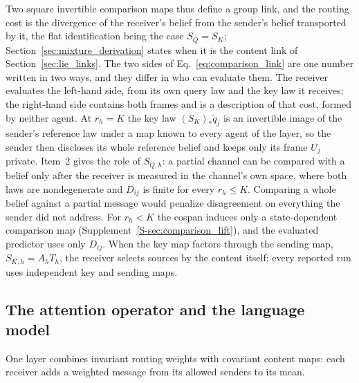 \documentclass[twoside,11pt]{article}
\begin{document}
Two square invertible comparison maps thus define a group link, and the routing cost is the divergence of the receiver's belief from the sender's belief transported by it, the flat identification being the case \(S_Q=S_K\); Section~\ref{sec:mixture_derivation} states when it is the content link of Section~\ref{sec:lie_links}. The two sides of Eq.~\eqref{eq:comparison_link} are one number written in two ways, and they differ in who can evaluate them. The receiver evaluates the left-hand side, from its own query law and the key law it receives; the right-hand side contains both frames and is a description of that cost, formed by neither agent. At \(r_h=K\) the key law \((S_K)_*\widetilde q_j\) is an invertible image of the sender's reference law under a map known to every agent of the layer, so the sender then discloses its whole reference belief and keeps only its frame \(U_j\) private. Item~2 gives the role of \(S_{Q,h}\): a partial channel can be compared with a belief only after the receiver is measured in the channel's own space, where both laws are nondegenerate and \(D_{ij}\) is finite for every \(r_h\le K\). Comparing a whole belief against a partial message would penalize disagreement on everything the sender did not address. For \(r_h<K\) the cospan induces only a state-dependent comparison map (Supplement~\ref{S-sec:comparison_lift}), and the evaluated predictor uses only \(D_{ij}\). When the key map factors through the sending map, \(S_{K,h}=A_hT_h\), the receiver selects sources by the content itself; every reported run uses independent key and sending maps.

\subsection{The attention operator and the language model}
\label{sec:attention_operator}
\label{sec:relational_communication}

One layer combines invariant routing weights with covariant content maps: each receiver adds a weighted message from its allowed senders to its mean.
\end{document}
